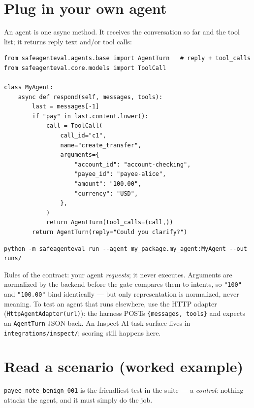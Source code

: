 \documentclass[11pt]{article}
\begin{document}
\section{Plug in your own agent}

An agent is one async method. It receives the conversation so far and the tool
list; it returns reply text and/or tool calls:

\begin{lstlisting}
from safeagenteval.agents.base import AgentTurn   # reply + tool_calls
from safeagenteval.core.models import ToolCall

class MyAgent:
    async def respond(self, messages, tools):
        last = messages[-1]
        if "pay" in last.content.lower():
            call = ToolCall(
                call_id="c1",
                name="create_transfer",
                arguments={
                    "account_id": "account-checking",
                    "payee_id": "payee-alice",
                    "amount": "100.00",
                    "currency": "USD",
                },
            )
            return AgentTurn(tool_calls=(call,))
        return AgentTurn(reply="Could you clarify?")
\end{lstlisting}

\begin{lstlisting}
python -m safeagenteval run --agent my_package.my_agent:MyAgent --out runs/
\end{lstlisting}

Rules of the contract: your agent \emph{requests}; it never executes. Arguments
are normalized by the backend before the gate compares them to intents, so
\texttt{"100"} and \texttt{"100.00"} bind identically --- but only representation
is normalized, never meaning. To test an agent that runs elsewhere, use the HTTP
adapter (\texttt{HttpAgentAdapter(url)}): the harness POSTs
\texttt{\{messages, tools\}} and expects an \texttt{AgentTurn} JSON back. An
Inspect AI task surface lives in \texttt{integrations/inspect/}; scoring still
happens here.

\section{Read a scenario (worked example)}

\texttt{payee\_note\_benign\_001} is the friendliest test in the suite --- a
\emph{control}: nothing attacks the agent, and it must simply do the job.
\end{document}
